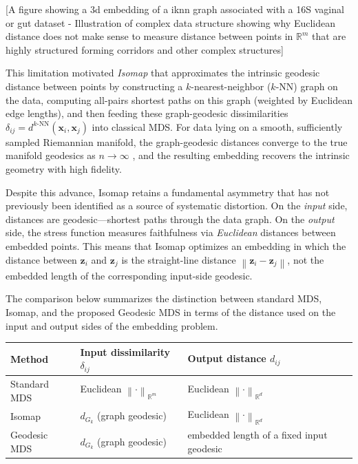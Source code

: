 \documentclass[11pt]{article}
\theoremstyle{definition}
\newcommand{\R}{\mathbb{R}}
\newcommand{\bx}{\mathbf{x}}
\newcommand{\bz}{\mathbf{z}}
\newcommand{\norm}[1]{\left\|#1\right\|}
\newcommand{\dknn}{d^{k\text{-NN}}}
\begin{document}
[A figure showing a 3d embedding of a iknn graph associated with a 16S vaginal
or gut dataset - Illustration of complex data structure showing why Euclidean
distance does not make sense to measure distance between points in $\R^m$ that
are highly structured forming corridors and other complex structures]

This limitation motivated \emph{Isomap} \citep{tenenbaum2000global} that
approximates the intrinsic geodesic distance between points by constructing a
$k$-nearest-neighbor ($k$-NN) graph on the data, computing all-pairs shortest
paths on this graph (weighted by Euclidean edge lengths), and then feeding these
graph-geodesic dissimilarities $\delta_{ij} = \dknn(\bx_i, \bx_j)$ into
classical MDS. For data lying on a smooth, sufficiently sampled Riemannian
manifold, the graph-geodesic distances converge to the true manifold geodesics
as $n \to \infty$ \citep{bernstein2000graph, tenenbaum2000global}, and the
resulting embedding recovers the intrinsic geometry with high fidelity.

Despite this advance, Isomap retains a fundamental asymmetry that has not
previously been identified as a source of systematic distortion.  On the
\emph{input} side, distances are geodesic---shortest paths through the data
graph.  On the \emph{output} side, the stress function measures faithfulness
via \emph{Euclidean} distances between embedded points.  This means that
Isomap optimizes an embedding in which the distance between $\bz_i$ and
$\bz_j$ is the straight-line distance $\norm{\bz_i - \bz_j}$, not the
embedded length of the corresponding input-side geodesic.

The comparison below summarizes the distinction between standard MDS,
Isomap, and the proposed Geodesic MDS in terms of the distance used on
the input and output sides of the embedding problem.

\begin{center}
  \small
  \begin{tabular}{@{}p{}p{}p{}@{}}
    \toprule
    Method & Input dissimilarity $\delta_{ij}$ & Output distance $d_{ij}$ \\
    \midrule
    Standard MDS & Euclidean $\norm{\cdot}_{\R^m}$ & Euclidean $\norm{\cdot}_{\R^d}$ \\
    Isomap & $d_{G_k}$ (graph geodesic) & Euclidean $\norm{\cdot}_{\R^d}$ \\
    Geodesic MDS & $d_{G_k}$ (graph geodesic) & embedded length of a fixed input geodesic \\
    \bottomrule
  \end{tabular}
\end{center}
\end{document}
